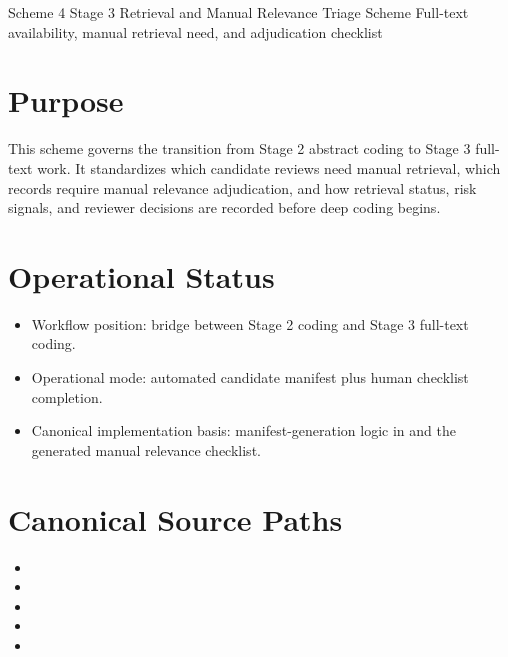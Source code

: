 \documentclass[11pt]{article}
\begin{document}
\schemeheader
  {Scheme 4}
  {Stage 3 Retrieval and Manual Relevance Triage Scheme}
  {Full-text availability, manual retrieval need, and adjudication checklist}

\section*{Purpose}
This scheme governs the transition from Stage 2 abstract coding to Stage 3 full-text work. It standardizes which candidate reviews need manual retrieval, which records require manual relevance adjudication, and how retrieval status, risk signals, and reviewer decisions are recorded before deep coding begins.

\section*{Operational Status}
\begin{itemize}
\item Workflow position: bridge between Stage 2 coding and Stage 3 full-text coding.
\item Operational mode: automated candidate manifest plus human checklist completion.
\item Canonical implementation basis: manifest-generation logic in  and the generated manual relevance checklist.
\end{itemize}

\section*{Canonical Source Paths}
\begin{itemize}
\item {}
\item {}
\item {}
\item {}
\item {}
\end{itemize}
\end{document}
